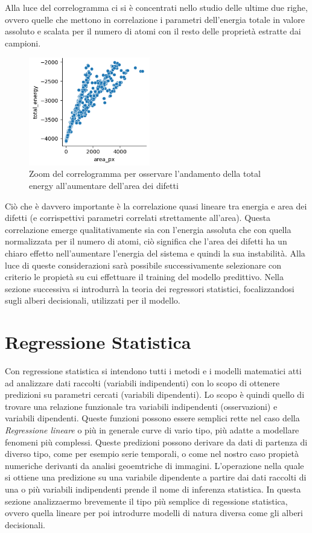 \documentclass[12pt,a4paper,openright,twoside]{report}
\begin{document}
Alla luce del correlogramma ci si è concentrati nello studio delle ultime due righe, ovvero
quelle che mettono in correlazione i parametri dell’energia totale in valore assoluto e scalata per il numero di atomi con il resto delle proprietà estratte dai campioni.
\begin{center}
\begin{figure}[h]
\centering
\includegraphics[width=200px,keepaspectratio]{energy_vs_area.png}
\caption{Zoom del correlogramma per osservare l’andamento della total energy
all’aumentare dell’area dei difetti}
\end{figure}    
\end{center}
Ciò che è davvero importante è la correlazione quasi lineare tra energia e area dei difetti (e corrispettivi parametri correlati strettamente all’area).
Questa correlazione emerge qualitativamente sia con l’energia assoluta che con quella
normalizzata per il numero di atomi, ciò significa che l’area dei difetti ha un chiaro effetto nell’aumentare l’energia del sistema e quindi la sua instabilità.
Alla luce di queste considerazioni sarà possibile successivamente selezionare con criterio le propietà su cui effettuare il training del modello predittivo. 
Nella sezione successiva si introdurrà la teoria dei regressori statistici, focalizzandosi sugli alberi decisionali, utilizzati per il modello. 
\section{Regressione Statistica}
Con regressione statistica si intendono tutti i metodi e i modelli matematici atti ad analizzare dati raccolti (variabili indipendenti) con lo scopo di ottenere predizioni su parametri cercati (variabili dipendenti). 
Lo scopo è quindi quello di trovare una relazione funzionale tra variabili indipendenti (osservazioni) e variabili dipendenti.
Queste funzioni possono essere semplici rette nel caso della \emph{Regressione lineare} o più in generale curve di vario tipo, più adatte a modellare fenomeni più complessi.
Queste predizioni possono derivare da dati di partenza di diverso tipo, come per esempio serie temporali, o come nel nostro caso propietà numeriche derivanti da analisi geoemtriche di immagini. L'operazione nella quale si ottiene una predizione su una variabile dipendente a partire dai dati raccolti di una o più variabili indipendenti prende il nome di inferenza statistica.
In questa sezione analizzaermo brevemente  il tipo più semplice di regessione statistica, ovvero quella lineare per poi introdurre modelli di natura diversa come gli alberi decisionali. 
\end{document}
